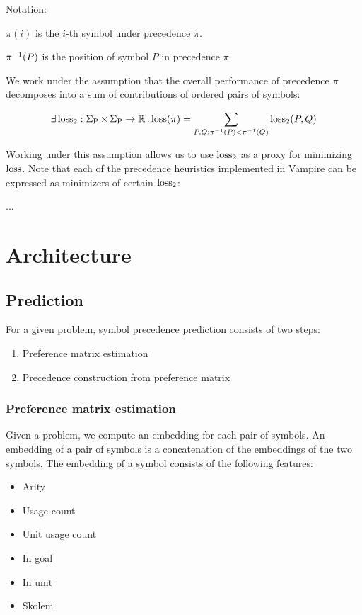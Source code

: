 Notation:

\(\pi(i)\) is the \(i\)-th symbol under precedence \(\pi\).

\(\pi^{-1}(P)\) is the position of symbol \(P\) in precedence \(\pi\).

We work under the assumption that the overall performance of precedence \(\pi\) decomposes into a sum of contributions of ordered pairs of symbols:

\begin{align*}
\exists \operatorname{loss}_2 : \operatorname{\Sigma_P} \times \operatorname{\Sigma_P} \rightarrow \operatorname{\mathbb{R}} . \operatorname{loss}(\pi) = \sum_{P, Q: \pi^{-1}(P) < \pi^{-1}(Q)} \operatorname{loss}_2(P, Q)
\end{align*}

Working under this assumption allows us to use \(\operatorname{loss}_2\) as a proxy for minimizing \(\operatorname{loss}\).
Note that each of the precedence heuristics implemented in Vampire can be expressed as minimizers of certain \(\operatorname{loss}_2\):

...



\section{Architecture}

\subsection{Prediction}

For a given problem, symbol precedence prediction consists of two steps:

\begin{enumerate}
	\item Preference matrix estimation
	\item Precedence construction from preference matrix
\end{enumerate}

\subsubsection{Preference matrix estimation}

Given a problem, we compute an embedding for each pair of symbols.
An embedding of a pair of symbols is a concatenation of the embeddings of the two symbols.
The embedding of a symbol consists of the following features:

\begin{itemize}
	\item Arity
	\item Usage count
	\item Unit usage count
	\item In goal
	\item In unit
	\item Skolem
\end{itemize}

